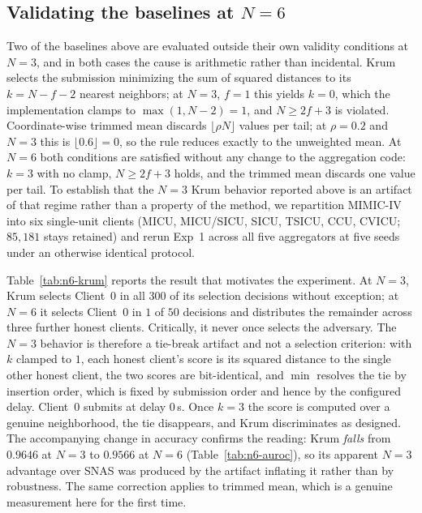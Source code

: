 \documentclass[pdflatex,sn-mathphys-num]{sn-jnl}
\begin{document}
\subsection{Validating the baselines at $N=6$}\label{sec:n6}

Two of the baselines above are evaluated outside their own validity conditions at $N=3$, and in both cases the cause is arithmetic rather than incidental. Krum selects the submission minimizing the sum of squared distances to its $k=N-f-2$ nearest neighbors; at $N=3$, $f=1$ this yields $k=0$, which the implementation clamps to $\max(1,N-2)=1$, and $N\geq2f+3$ is violated. Coordinate-wise trimmed mean discards $\lfloor \rho N \rfloor$ values per tail; at $\rho=0.2$ and $N=3$ this is $\lfloor 0.6 \rfloor = 0$, so the rule reduces exactly to the unweighted mean. At $N=6$ both conditions are satisfied without any change to the aggregation code: $k=3$ with no clamp, $N\geq2f+3$ holds, and the trimmed mean discards one value per tail. To establish that the $N=3$ Krum behavior reported above is an artifact of that regime rather than a property of the method, we repartition MIMIC-IV into six single-unit clients (MICU, MICU/SICU, SICU, TSICU, CCU, CVICU; $85{,}181$ stays retained) and rerun Exp~1 across all five aggregators at five seeds under an otherwise identical protocol.

Table~\ref{tab:n6-krum} reports the result that motivates the experiment. At $N=3$, Krum selects Client~0 in all $300$ of its selection decisions without exception; at $N=6$ it selects Client~0 in $1$ of $50$ decisions and distributes the remainder across three further honest clients. Critically, it never once selects the adversary. The $N=3$ behavior is therefore a tie-break artifact and not a selection criterion: with $k$ clamped to $1$, each honest client's score is its squared distance to the single other honest client, the two scores are bit-identical, and $\min$ resolves the tie by insertion order, which is fixed by submission order and hence by the configured delay. Client~0 submits at delay $0$\,s. Once $k=3$ the score is computed over a genuine neighborhood, the tie disappears, and Krum discriminates as designed. The accompanying change in accuracy confirms the reading: Krum \emph{falls} from $0.9646$ at $N=3$ to $0.9566$ at $N=6$ (Table~\ref{tab:n6-auroc}), so its apparent $N=3$ advantage over SNAS was produced by the artifact inflating it rather than by robustness. The same correction applies to trimmed mean, which is a genuine measurement here for the first time.
\end{document}
